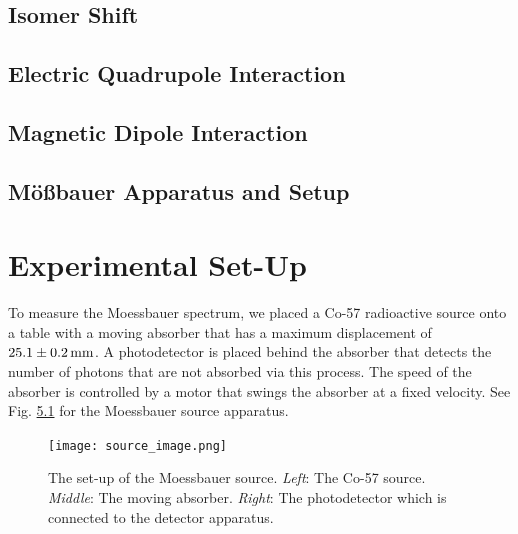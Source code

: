 \documentclass[a4paper]{report}
\numberwithin{equation}{section}
\begin{document}
\section{Isomer Shift}

\section{Electric Quadrupole Interaction}

\section{Magnetic Dipole Interaction}

\section{M\"o{\ss}bauer Apparatus and Setup}


\chapter{Experimental Set-Up}

To measure the Moessbauer spectrum, we placed a Co-57 radioactive source onto a table with a moving absorber 
that has a maximum displacement of $\SI[]{25.1 \pm 0.2}[]{\milli\metre}$.  A photodetector is placed 
behind the absorber that detects the number of photons that are not absorbed via this process. The speed of the 
absorber is controlled by a motor that swings the absorber at a fixed velocity. See Fig. \ref{fig:apparatus_source}
for the Moessbauer source apparatus. \par 

\begin{figure}[htb!]
	\centering
	\texttt{[image: source\_image.png]}

	\caption{The set-up of the Moessbauer source. \textit{Left}: The Co-57 source. \textit{Middle}: 
	The moving absorber. \textit{Right}: The photodetector which is connected to the detector apparatus.
	}
	\label{fig:apparatus_source}
\end{figure}
\end{document}

